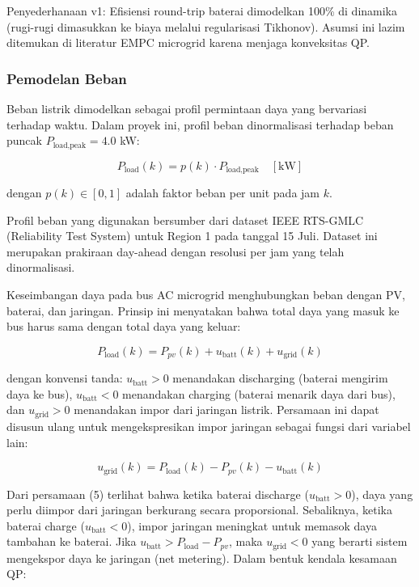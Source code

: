 \documentclass{article}
\begin{document}
Penyederhanaan v1: Efisiensi round-trip baterai dimodelkan 100\% di dinamika (rugi-rugi dimasukkan ke biaya melalui regularisasi Tikhonov). Asumsi ini lazim ditemukan di literatur EMPC microgrid \cite{cortes2024} karena menjaga konveksitas QP.

\subsubsection{Pemodelan Beban}

Beban listrik dimodelkan sebagai profil permintaan daya yang bervariasi terhadap waktu. Dalam proyek ini, profil beban dinormalisasi terhadap beban puncak $P_{\text{load,peak}} = 4.0$ kW:

\begin{equation}
P_{\text{load}}(k) = p(k) \cdot P_{\text{load,peak}} \quad [\text{kW}]
\end{equation}

dengan $p(k) \in [0, 1]$ adalah faktor beban per unit pada jam $k$.

Profil beban yang digunakan bersumber dari dataset IEEE RTS-GMLC (Reliability Test System) untuk Region 1 pada tanggal 15 Juli. Dataset ini merupakan prakiraan day-ahead dengan resolusi per jam yang telah dinormalisasi.

Keseimbangan daya pada bus AC microgrid menghubungkan beban dengan PV, baterai, dan jaringan. Prinsip ini menyatakan bahwa total daya yang masuk ke bus harus sama dengan total daya yang keluar:

\begin{equation}
P_{\text{load}}(k) = P_{pv}(k) + u_{\text{batt}}(k) + u_{\text{grid}}(k)
\end{equation}

dengan konvensi tanda: $u_{\text{batt}} > 0$ menandakan discharging (baterai mengirim daya ke bus), $u_{\text{batt}} < 0$ menandakan charging (baterai menarik daya dari bus), dan $u_{\text{grid}} > 0$ menandakan impor dari jaringan listrik. Persamaan ini dapat disusun ulang untuk mengekspresikan impor jaringan sebagai fungsi dari variabel lain:

\begin{equation}
u_{\text{grid}}(k) = P_{\text{load}}(k) - P_{pv}(k) - u_{\text{batt}}(k)
\end{equation}

Dari persamaan (5) terlihat bahwa ketika baterai discharge ($u_{\text{batt}} > 0$), daya yang perlu diimpor dari jaringan berkurang secara proporsional. Sebaliknya, ketika baterai charge ($u_{\text{batt}} < 0$), impor jaringan meningkat untuk memasok daya tambahan ke baterai. Jika $u_{\text{batt}} > P_{\text{load}} - P_{pv}$, maka $u_{\text{grid}} < 0$ yang berarti sistem mengekspor daya ke jaringan (net metering). Dalam bentuk kendala kesamaan QP:
\end{document}
